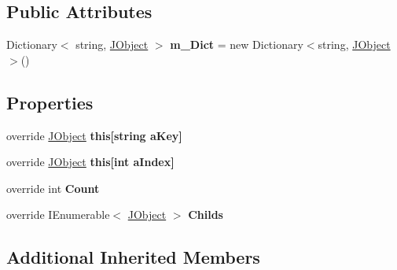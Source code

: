 \subsection*{Public Attributes}
\begin{DoxyCompactItemize}
\item 
\hypertarget{class_simple_j_s_o_n_1_1_j_s_o_n_class_a606409faf467447c5897c8a068d7c2c0}{Dictionary$<$ string, \hyperlink{class_simple_j_s_o_n_1_1_j_object}{J\+Object} $>$ {\bfseries m\+\_\+\+Dict} = new Dictionary$<$string, \hyperlink{class_simple_j_s_o_n_1_1_j_object}{J\+Object}$>$()}\label{class_simple_j_s_o_n_1_1_j_s_o_n_class_a606409faf467447c5897c8a068d7c2c0}

\end{DoxyCompactItemize}
\subsection*{Properties}
\begin{DoxyCompactItemize}
\item 
\hypertarget{class_simple_j_s_o_n_1_1_j_s_o_n_class_aa11b8bd3d3588595a8fe963816596713}{override \hyperlink{class_simple_j_s_o_n_1_1_j_object}{J\+Object} {\bfseries this\mbox{[}string a\+Key\mbox{]}}}\label{class_simple_j_s_o_n_1_1_j_s_o_n_class_aa11b8bd3d3588595a8fe963816596713}

\item 
\hypertarget{class_simple_j_s_o_n_1_1_j_s_o_n_class_adcf38db2b8325f7693e0b6cee5f250be}{override \hyperlink{class_simple_j_s_o_n_1_1_j_object}{J\+Object} {\bfseries this\mbox{[}int a\+Index\mbox{]}}}\label{class_simple_j_s_o_n_1_1_j_s_o_n_class_adcf38db2b8325f7693e0b6cee5f250be}

\item 
\hypertarget{class_simple_j_s_o_n_1_1_j_s_o_n_class_a5439d331d07d7410c7477022f3338238}{override int {\bfseries Count}}\label{class_simple_j_s_o_n_1_1_j_s_o_n_class_a5439d331d07d7410c7477022f3338238}

\item 
\hypertarget{class_simple_j_s_o_n_1_1_j_s_o_n_class_a6fa41cd5458ec5e604324eaf3a110c95}{override I\+Enumerable$<$ \hyperlink{class_simple_j_s_o_n_1_1_j_object}{J\+Object} $>$ {\bfseries Childs}}\label{class_simple_j_s_o_n_1_1_j_s_o_n_class_a6fa41cd5458ec5e604324eaf3a110c95}

\end{DoxyCompactItemize}
\subsection*{Additional Inherited Members}

